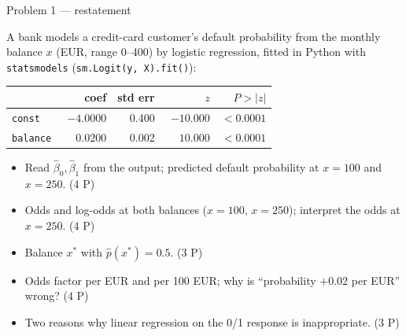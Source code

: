 \documentclass[aspectratio=169,11pt]{beamer}
\begin{document}
\begin{frame}{Problem 1 --- restatement}
  \begin{exercise}
    A bank models a credit-card customer's default probability from the monthly balance $x$
    (EUR, range 0--400) by logistic regression, fitted in Python with \texttt{statsmodels}
    (\texttt{sm.Logit(y, X).fit()}):
    \begin{center}\scriptsize
    \begin{tabular}{lrrrr}
      \toprule
       & coef & std err & $z$ & $P>|z|$\\
      \midrule
      \texttt{const}   & $-4.0000$ & 0.400 & $-10.000$ & $<0.0001$\\
      \texttt{balance} & $\phantom{-}0.0200$ & 0.002 & $\phantom{-}10.000$ & $<0.0001$\\
      \bottomrule
    \end{tabular}
    \end{center}
    \begin{itemize}
      \item[(a)] Read $\hat{\beta}_0,\hat{\beta}_1$ from the output; predicted default
        probability at $x=100$ and $x=250$. \hfill (4 P)
      \item[(b)] Odds and log-odds at both balances ($x=100$, $x=250$); interpret the odds
        at $x=250$. \hfill (4 P)
      \item[(c)] Balance $x^{*}$ with $\hat{p}(x^{*})=0.5$. \hfill (3 P)
      \item[(d)] Odds factor per EUR and per 100 EUR; why is ``probability $+0.02$ per EUR''
        wrong? \hfill (4 P)
      \item[(e)] Two reasons why linear regression on the 0/1 response is inappropriate. \hfill (3 P)
    \end{itemize}
  \end{exercise}
\end{frame}
\end{document}
